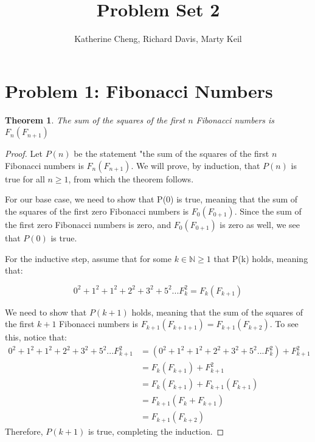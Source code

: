 \documentclass[10pt,letter]{article}
\newtheorem*{thm}{Theorem}
\begin{document}

\title{Problem Set 2}

\author{Katherine Cheng, Richard Davis, Marty Keil}

 
\maketitle 


\section*{Problem 1: Fibonacci Numbers}

\begin{thm}The sum of the squares of the first $n$ Fibonacci numbers is $F_{n}(F_{n+1})$\end{thm}
\begin{proof}
Let $P(n)$ be the statement "the sum of the squares of the first $n$ Fibonacci numbers is $F_{n}(F_{n+1})$. We will prove, by induction, that $P(n)$ is true for all $n\geq1$, from which the theorem follows. 

\item For our base case, we need to show that P(0) is true, meaning that the sum of the squares of the first zero Fibonacci numbers is $F_{0}(F_{0+1})$. Since the sum of the first zero Fibonacci numbers is zero, and $F_{0}(F_{0+1})$ is zero as well, we see that $P(0)$ is true.

\item For the inductive step, assume that for some $k \in \mathbb{N} \geq 1$ that P(k) holds, meaning that:

\begin{equation} \label{eq:1}
0^2 + 1^2 + 1^2 + 2^2 + 3^2 + 5^2 ... F_{k}^2 = F_{k}(F_{k+1})
\end{equation}

\item We need to show that $P(k+1)$ holds, meaning that the sum of the squares of the first $k+1$ Fibonacci numbers is $F_{k+1}(F_{k+1+1}) = F_{k+1}(F_{k+2})$. To see this, notice that:
\begin{align*}
0^2 + 1^2 + 1^2 + 2^2 + 3^2 + 5^2 ... F_{k+1}^2 &= (0^2 + 1^2 + 1^2 + 2^2 + 3^2 + 5^2 ... F_{k}^2) + F_{k+1}^2\\
&= F_{k}(F_{k+1}) + F_{k+1}^2 \tag{via (1)}\\ 
&= F_{k}(F_{k+1}) + F_{k+1}(F_{k+1})\\
&= F_{k+1}(F_{k}+F_{k+1})\\
&= F_{k+1}(F_{k+2})\tag{via Fibonacci recurrence relation}
\end{align*}
Therefore, $P(k+1)$ is true, completing the induction. 
\end{proof}
\end{document}

